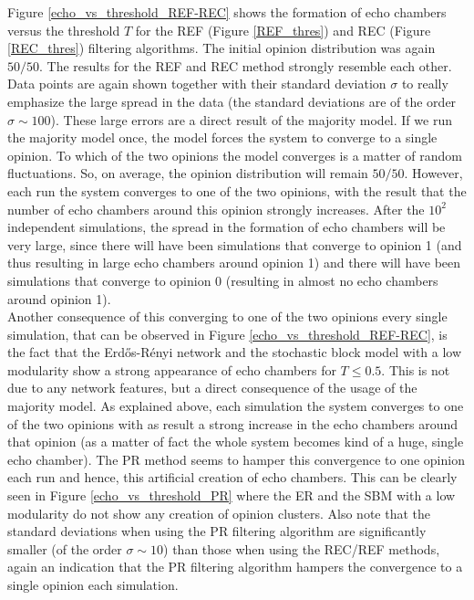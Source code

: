 \documentclass[11 pt , letterpaper , twoside , openright]{book}
\begin{document}
Figure \ref{echo_vs_threshold_REF-REC} shows the formation of echo chambers versus the threshold $T$ for the REF (Figure \ref{REF_thres}) and REC (Figure \ref{REC_thres}) filtering algorithms. The initial opinion distribution was again $50/50$. The results for the REF and REC method strongly resemble each other. Data points are again shown together with their standard deviation $\sigma$ to really emphasize the large spread in the data (the standard deviations are of the order $\sigma \sim 100$). These large errors are a direct result of the majority model. If we run the majority model once, the model forces the system to converge to a single opinion. To which of the two opinions the model converges is a matter of random fluctuations. So, on average, the opinion distribution will remain $50/50$. However, each run the system converges to one of the two opinions, with the result that the number of echo chambers around this opinion strongly increases. After the $10^2$ independent simulations, the spread in the formation of echo chambers will be very large, since there will have been simulations that converge to opinion 1 (and thus resulting in large echo chambers around opinion 1) and there will have been simulations that converge to opinion 0 (resulting in almost no echo chambers around opinion 1).\\
Another consequence of this converging to one of the two opinions every single simulation, that can be observed in Figure \ref{echo_vs_threshold_REF-REC}, is the fact that the Erd\H{o}s-R\'{e}nyi network and the stochastic block model with a low modularity show a strong appearance of echo chambers for $T \leqslant 0.5$. This is not due to any network features, but a direct consequence of the usage of the majority model. As explained above, each simulation the system converges to one of the two opinions with as result a strong increase in the echo chambers around that opinion (as a matter of fact the whole system becomes kind of a huge, single echo chamber). The PR method seems to hamper this convergence to one opinion each run and hence, this artificial creation of echo chambers. This can be clearly seen in Figure \ref{echo_vs_threshold_PR} where the ER and the SBM with a low modularity do not show any creation of opinion clusters. Also note that the standard deviations when using the PR filtering algorithm are significantly smaller (of the order $\sigma \sim 10$) than those when using the REC/REF methods, again an indication that the PR filtering algorithm hampers the convergence to a single opinion each simulation.\\
\end{document}
